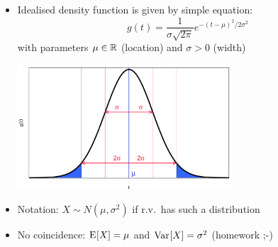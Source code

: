 \documentclass[t]{beamer} %
\begin{document}
\begin{frame}
  \frametitle{}

  \begin{itemize}
  \item Idealised density function is given by simple equation:
    \[
    g(t) = \frac{1}{\sigma \sqrt{2\pi}} e^{-(t-\mu)^2 / 2\sigma^2}
    \]
    with parameters $\mu\in\mathbb{R}$ (location) and $\sigma > 0$ (width)
    \begin{center}
      \includegraphics[width=8cm]{img/gaussian_parameters}
    \end{center}
  \item Notation: $X \sim N(\mu,\sigma^2)$ if r.v.\ has such a distribution
  \item No coincidence: $\mathrm{E}_{}[X] = \mu$ and $\mathop{\mathrm{Var}}_{}[X] = \sigma^2$ (\so homework ;-)
  \end{itemize}
\end{frame}
\end{document}

